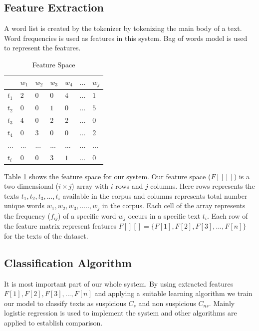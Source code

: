 \subsection{\textbf{Feature Extraction}}
A word list is created by the tokenizer by tokenizing the main body of a text. Word frequencies is used as features in this system. Bag of words model is used to represent the features.
\renewcommand{\arraystretch}{1.3}
\begin{table}[h!]
\begin{center}
\caption{Feature Space}
\begin{tabular}{|m{0.7cm} | m{0.7cm}| m{0.7cm}|m{0.7cm} | m{0.7cm}|m{1cm}|m{0.7cm}|}
\hline
     & $w_1$ & $w_2$  & $w_3$ &$w_4$ &$...$ & $w_j$  \\
\hline
     $t_1$ & $2$ & $0$  & $0$ &$4$ &$...$ & $1$  \\
\hline
     $t_2$ & $0$ & $0$  & $1$ &$0$ &$...$ & $5$  \\
\hline
     $t_3$ & $4$ & $0$  & $2$ &$2$ &$...$ & $0$  \\
\hline
     $t_4$ & $0$ & $3$  & $0$ &$0$ &$...$ & $2$  \\
\hline
     $...$ & $...$ & ...  & $...$ &$...$ &$...$ & $...$  \\
\hline
     $t_i$ & $0$ & $0$  & $3$ &$1$ &$...$ & $0$  \\
\hline
\end{tabular}
\label{ff}
\end{center}
\end{table}
Table \ref{ff} shows the feature space for our system. Our feature space ($F[][]$) is a two dimensional ($i\times j$) array with $i$ rows and $j$ columns.
Here rows represents the texts $t_1, t_2, t_3, ..., t_i$ available in the corpus and columns represents total number unique words $w_1, w_2, w_3, ....., w_j$ in the corpus. Each cell of the array represents the frequency ($f_{ij}$) of a specific word $w_j$ occurs in a specific text $t_i$. Each row of the feature matrix represent features $F[][] =\{F[1], F[2], F[3], ... ,F[n]\} $ for the texts of the dataset. 

\subsection{\textbf{Classification Algorithm}}
It is most important part of our whole system. By using extracted features $F[1], F[2], F[3], ... ,F[n]$ and applying a suitable learning algorithm we train our model to classify texts as suspicious $C_s$ and non suspicious $C_{ns}$. Mainly logistic regression is used to implement the system and other algorithms are applied to establish comparison. 

